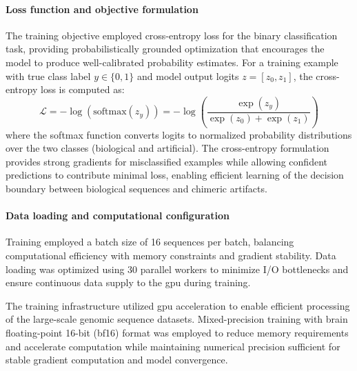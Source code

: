 \documentclass[pdflatex,sn-nature]{sn-jnl}%
\theoremstyle{thmstyleone}%
\theoremstyle{thmstyletwo}%
\theoremstyle{thmstylethree}%
\begin{document}
\paragraph{Loss function and objective formulation}
The training objective employed cross-entropy loss for the binary classification task, providing probabilistically grounded optimization that encourages the model to produce well-calibrated probability estimates.
For a training example with true class label $y \in \{0,1\}$ and model output logits $z = [z_0, z_1]$, the cross-entropy loss is computed as:
$$
	\mathcal{L} = -\log(\textrm{softmax}(z_y)) = -\log\left(\frac{\exp(z_y)}{\exp(z_0) + \exp(z_1)}\right)
$$
where the softmax function converts logits to normalized probability distributions over the two classes (biological and artificial).
The cross-entropy formulation provides strong gradients for misclassified examples while allowing confident predictions to contribute minimal loss, enabling efficient learning of the decision boundary between biological sequences and chimeric artifacts.

\paragraph{Data loading and computational configuration}
Training employed a batch size of 16 sequences per batch, balancing computational efficiency with memory constraints and gradient stability.
Data loading was optimized using 30 parallel workers to minimize I/O bottlenecks and ensure continuous data supply to the \gls{gpu} during training.

The training infrastructure utilized \gls{gpu} acceleration to enable efficient processing of the large-scale genomic sequence datasets.
Mixed-precision training with brain floating-point 16-bit (bf16) format was employed to reduce memory requirements and accelerate computation while maintaining numerical precision sufficient for stable gradient computation and model convergence.
\end{document}
